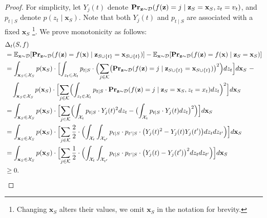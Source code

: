 \documentclass{article}
\newcommand{\z}{\textbf{z}}
\newcommand{\x}{\textbf{x}}
\newcommand{\fml}[1]{{\mathcal{#1}}}
\newcommand{\mbf}[1]{\ensuremath\mathbf{#1}}
\newcommand{\mbb}[1]{\ensuremath\mathbb{#1}}
\begin{document}
\begin{proof}
For simplicity, let $Y_{j}(t)$ denote $\mbf{Pr}_{\z\sim \mathcal{D}}(f(\z) = j \mid \z_{S} = \x_{S}, z_t = v_t)$, and $p_{t\mid S}$ denote $p(z_t \mid \x_{S})$.
Note that both $Y_{j}(t)$ and $p_{t\mid S}$ are associated with a fixed $\x_{S}$
\footnote{Changing $\x_{S}$ alters their values, we omit $\x_S$ in the notation for brevity.}.
We prove monotonicity as follows:
\begin{equation}
\begin{aligned}
&\Delta_{t}(S,f) \\
&= \mbb{E}_{\x\sim \mathcal{D}}[\mbf{Pr}_{\z\sim \mathcal{D}}(f(\z) = f(\x) \mid \z_{S\cup\{t\}} = \x_{S\cup\{t\}})] - \mbb{E}_{\x\sim \mathcal{D}}[\mbf{Pr}_{\z\sim \mathcal{D}}(f(\z) = f(\x) \mid \z_{S} = \x_{S})] \\
&= \int_{\x_{S} \in \fml{X}_{S}} p(\x_{S}) \cdot \Bigl[ \int_{z_t \in \fml{X}_t} p_{t\mid S}
\cdot \Bigl(\sum_{j\in \fml{K}} \bigl(\mbf{Pr}_{\z\sim \mathcal{D}}(f(\z) = j \mid \z_{S\cup\{t\}} = \x_{S\cup\{t\}})\bigr)^2\Bigr) dz_t \Bigr] d\x_{S} \ - \\
&\hspace{1em} \int_{\x_{S} \in \fml{X}_{S}} p(\x_{S}) \cdot \Bigl[\sum_{j \in \fml{K}} 
\Bigl(\int_{z_t \in \fml{X}_t} p_{t\mid S} \cdot \mbf{Pr}_{\z\sim \mathcal{D}}(f(\z) = j \mid \z_{S} = \x_{S}, z_t = x_t) dz_t\Bigr)^2\Bigr] d\x_{S} \\
%
&= \int_{\x_{S} \in \fml{X}_{S}} p(\x_{S}) \cdot \Bigl[ \sum_{j\in \fml{K}} \Bigl(
\int_{\fml{X}_t} p_{t\mid S} \cdot Y_{j}(t)^2 dz_t - \bigl( \int_{\fml{X}_t} p_{t\mid S} \cdot Y_{j}(t) dz_t \bigr)^2 \Bigr) \Bigr] d\x_{S} \\
%
&= \int_{\x_{S} \in \fml{X}_{S}} p(\x_{S}) \cdot \Bigl[ \sum_{j\in \fml{K}} \frac{2}{2} \cdot \Bigl(
\int_{\fml{X}_t} \int_{\fml{X}_{t'}} p_{t\mid S} \cdot p_{t' \mid S} \cdot \bigl(Y_{j}(t)^2 - Y_{j}(t) Y_{j}(t')\bigr) dz_t dz_{t'} \Bigr) \Bigr] d\x_{S} \\
&= \int_{\x_{S} \in \fml{X}_{S}} p(\x_{S}) \cdot \Bigl[ \sum_{j\in \fml{K}} \frac{1}{2} \cdot \Bigl(
\int_{\fml{X}_t} \int_{\fml{X}_{t'}} p_{t\mid S} \cdot p_{t' \mid S} \cdot \bigl(Y_{j}(t) - Y_{j}(t')\bigr)^2 dz_t dz_{t'} \Bigr) \Bigr] d\x_{S} \\
%
&\ge 0.
\end{aligned}
\end{equation}

\end{proof}
\end{document}
